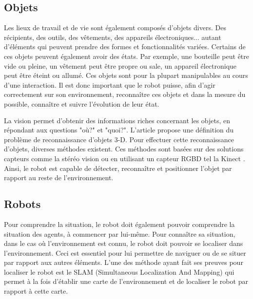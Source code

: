 \documentclass[a4paper,11pt,twoside]{StyleThese}
\begin{document}
\subsection{Objets}
Les lieux de travail et de vie sont également composés d'objets divers. Des récipients, des outils, des vêtements, des appareils électroniques... autant d'éléments qui peuvent prendre des formes et fonctionnalités variées.
Certains de ces objets peuvent également avoir des états. Par exemple, une bouteille peut être vide ou pleine, un vêtement peut être propre ou sale, un appareil électronique peut être éteint ou allumé.
Ces objets sont pour la plupart manipulables au cours d'une interaction. Il est donc important que le robot puisse, afin d'agir correctement sur son environnement, reconnaître ces objets et dans la mesure du possible, connaître et suivre l'évolution de leur état.

La vision permet d'obtenir des informations riches concernant les objets, en répondant aux questions "où?" et "quoi?". L'article \cite{Besl1985} propose une définition du problème de reconnaissance d'objets 3-D. Pour effectuer cette reconnaissance d'objets, diverses méthodes existent. Ces méthodes sont basées sur des solutions capteurs comme la stéréo vision \cite{murphy2005}
ou en utilisant un capteur RGBD tel la Kinect \cite{tang2012}.
Ainsi, le robot est capable de détecter, reconnaître et positionner l'objet par rapport au reste de l'environnement.


\subsection{Robots}
Pour comprendre la situation, le robot doit également pouvoir comprendre la situation des agents, à commencer par lui-même. 
Pour connaître sa situation, dans le cas où l'environnement est connu, le robot doit pouvoir se localiser dans l'environnement. Ceci est essentiel pour lui permettre de naviguer ou de se situer par rapport aux autres éléments.
L'une des méthode ayant fait ses preuves pour localiser le robot est le SLAM (Simultaneous Localization And Mapping) qui permet à la fois d'établir une carte de l'environnement et de
localiser le robot par rapport à cette carte.
\end{document}
